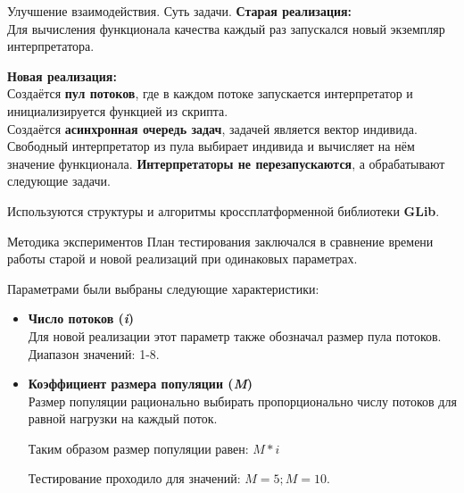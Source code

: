 \documentclass{beamer}
\begin{document}
\begin{frame}{Улучшение взаимодействия. Суть задачи.}
    \large{\textbf{Старая реализация:}}\\
    Для вычисления функционала
    качества каждый раз запускался
    новый экземпляр интерпретатора.
    \bigskip

    \large{\textbf{Новая реализация:}}\\
    Создаётся \textbf{пул потоков},
    где в каждом потоке запускается интерпретатор
    и инициализируется функцией из скрипта.\\
    Создаётся \textbf{асинхронная очередь задач},
    задачей является вектор индивида.\\
    Свободный интерпретатор из пула
    выбирает индивида и вычисляет на нём значение функционала.
    \textbf{Интерпретаторы не перезапускаются},
    а обрабатывают следующие задачи.
    \bigskip

    Используются структуры и алгоритмы
    кроссплатформенной библиотеки \textbf{GLib}.
\end{frame}

\begin{frame}{Методика экспериментов}
    План тестирования заключался
    в сравнение времени работы
    старой и новой реализаций
    при одинаковых параметрах.
    \bigskip

    Параметрами были выбраны следующие характеристики:
    \begin{itemize}
        \item \textbf{Число потоков (\textit{i})}\\
            Для новой реализации этот параметр также
            обозначал размер пула потоков.
            Диапазон значений: 1-8.
        \item \textbf{Коэффициент размера популяции (\textit{M})}\\
            Размер популяции рационально выбирать
            пропорционально числу потоков
            для равной нагрузки на каждый поток.

            Таким образом размер популяции равен:
            \begin{math}M * i\end{math}

            Тестирование проходило для значений:
            \begin{math}M = 5; M = 10\end{math}.
    \end{itemize}

\end{frame}
\end{document}
